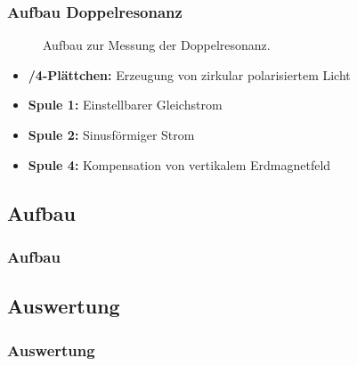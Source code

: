 \begin{frame}
\frametitle{Aufbau Doppelresonanz}

\begin{figure}
    \centering
    \def\svgwidth{\textwidth}
    
    \caption{Aufbau zur Messung der Doppelresonanz.}
\end{figure}

\begin{itemize}
  \item \textbf{\textlambda/4-Plättchen:} Erzeugung von zirkular polarisiertem Licht
  \item \textbf{Spule 1:} Einstellbarer Gleichstrom
  \item \textbf{Spule 2:} Sinusförmiger Strom
  \item \textbf{Spule 4:} Kompensation von vertikalem Erdmagnetfeld
\end{itemize}

\end{frame}




\subsection{Aufbau}
\begin{frame}
\frametitle{Aufbau}
  
\end{frame}

\subsection{Auswertung}
\begin{frame}
\frametitle{Auswertung}
  
\end{frame}